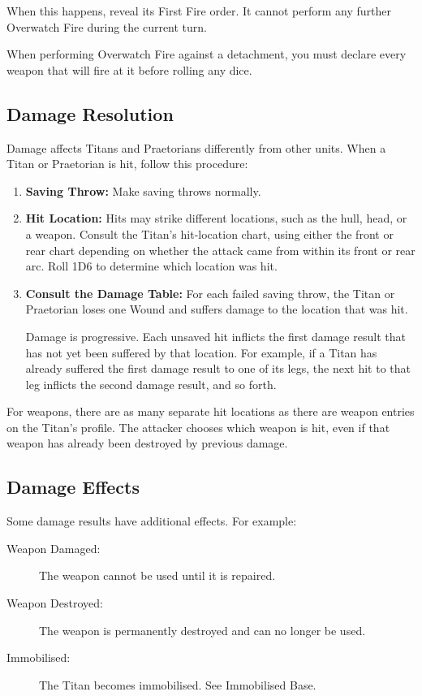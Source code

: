 When this happens, reveal its First Fire order. It cannot perform any further Overwatch Fire during the current turn.

When performing Overwatch Fire against a detachment, you must declare every weapon that will fire at it before rolling any dice.

\subsection{Damage Resolution}

Damage affects Titans and Praetorians differently from other units. When a Titan or Praetorian is hit, follow this procedure:

\begin{enumerate}
    \item \textbf{Saving Throw:} Make saving throws normally.

    \item \textbf{Hit Location:} Hits may strike different locations, such as the hull, head, or a weapon. Consult the Titan's hit-location chart, using either the front or rear chart depending on whether the attack came from within its front or rear arc. Roll 1D6 to determine which location was hit.

    \item \textbf{Consult the Damage Table:} For each failed saving throw, the Titan or Praetorian loses one Wound and suffers damage to the location that was hit.

    Damage is progressive. Each unsaved hit inflicts the first damage result that has not yet been suffered by that location. For example, if a Titan has already suffered the first damage result to one of its legs, the next hit to that leg inflicts the second damage result, and so forth.
\end{enumerate}

For weapons, there are as many separate hit locations as there are weapon entries on the Titan's profile. The attacker chooses which weapon is hit, even if that weapon has already been destroyed by previous damage.

\subsection{Damage Effects}

Some damage results have additional effects. For example:

\begin{description}
    \item[Weapon Damaged:] The weapon cannot be used until it is repaired.

    \item[Weapon Destroyed:] The weapon is permanently destroyed and can no longer be used.

    \item[Immobilised:] The Titan becomes immobilised. See Immobilised Base.
\end{description}

